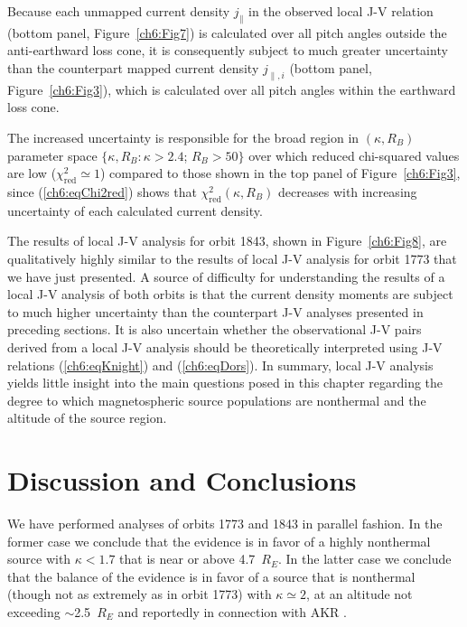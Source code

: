   Because each unmapped current density $j_\parallel$ in the observed local J-V
  relation (bottom panel, Figure~\ref{ch6:Fig7}) is calculated over all pitch
  angles outside the anti-earthward loss cone, it is consequently subject to
  much greater uncertainty than the counterpart mapped current density
  $j_{\parallel,i}$ (bottom panel, Figure~\ref{ch6:Fig3}), which is calculated
  over all pitch angles within the earthward loss cone.
  
  The increased uncertainty is responsible for the broad region in
  $(\kappa, R_B)$ parameter space $\{ \kappa, R_B : \kappa > 2.4$; $R_B > 50 \}$
  over which reduced chi-squared values are low
  ($\chi_{\mathrm{red}}^2 \simeq 1$) compared to those shown in the top panel of
  Figure~\ref{ch6:Fig3}, since (\ref{ch6:eqChi2red}) shows that
  $\chi^2_{\mathrm{red}} (\kappa, R_B)$ decreases with increasing uncertainty of
  each calculated current density.

  The results of local J-V analysis for orbit 1843, shown in
  Figure~\ref{ch6:Fig8}, are qualitatively highly similar to the results of
  local J-V analysis for orbit 1773 that we have just presented. A source of
  difficulty for understanding the results of a local J-V analysis of both
  orbits is that the current density moments are subject to much higher
  uncertainty than the counterpart J-V analyses presented in preceding
  sections. It is also uncertain whether the observational J-V pairs derived
  from a local J-V analysis should be theoretically interpreted using J-V
  relations (\ref{ch6:eqKnight}) and (\ref{ch6:eqDors}). In summary, local J-V
  analysis yields little insight into the main questions posed in this chapter
  regarding the degree to which magnetospheric source populations are nonthermal
  and the altitude of the source region.

  \section{Discussion and Conclusions}

  We have performed analyses of orbits 1773 and 1843 in parallel fashion. In the
  former case we conclude that the evidence is in favor of a highly nonthermal
  source with $\kappa < 1.7$ that is near or above 4.7~$R_E$. In the latter case
  we conclude that the balance of the evidence is in favor of a source that is
  nonthermal (though not as extremely as in orbit 1773) with $\kappa \simeq 2$,
  at an altitude not exceeding $\sim$2.5~$R_E$ and reportedly in connection with
  AKR \citep{Ergun1998}.

